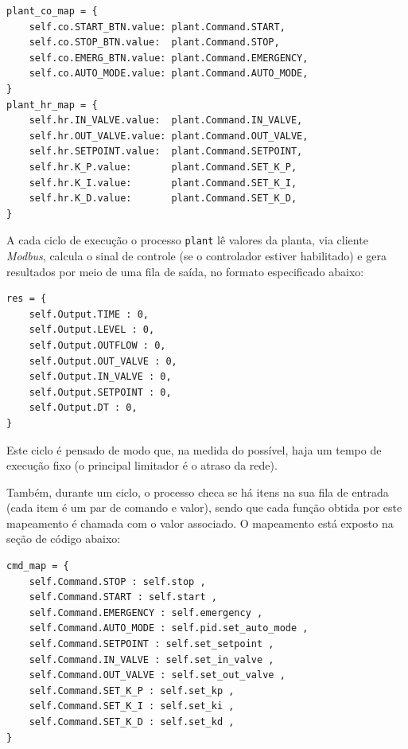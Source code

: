\documentclass[
	article,			%
	11pt,				%
	oneside,			%
	a4paper,			%
	section=TITLE,		%
	english,			%
	brazil,				%
	sumario=tradicional
	]{abntex2}
\newcommand{\Mb}{\textit{Modbus}}%
\begin{document}
\begin{verbatim}
plant_co_map = {
    self.co.START_BTN.value: plant.Command.START,
    self.co.STOP_BTN.value:  plant.Command.STOP,
    self.co.EMERG_BTN.value: plant.Command.EMERGENCY,
    self.co.AUTO_MODE.value: plant.Command.AUTO_MODE,
}
plant_hr_map = {
    self.hr.IN_VALVE.value:  plant.Command.IN_VALVE,
    self.hr.OUT_VALVE.value: plant.Command.OUT_VALVE,
    self.hr.SETPOINT.value:  plant.Command.SETPOINT,
    self.hr.K_P.value:       plant.Command.SET_K_P,
    self.hr.K_I.value:       plant.Command.SET_K_I,
    self.hr.K_D.value:       plant.Command.SET_K_D,
}
\end{verbatim}
A cada ciclo de execução o processo \texttt{plant} lê valores da planta, via cliente \Mb, calcula o sinal de controle (se o controlador estiver habilitado) e gera resultados por meio de uma fila de saída, no formato especificado abaixo:

\begin{verbatim}
res = {
    self.Output.TIME : 0,
    self.Output.LEVEL : 0,
    self.Output.OUTFLOW : 0,
    self.Output.OUT_VALVE : 0,
    self.Output.IN_VALVE : 0,
    self.Output.SETPOINT : 0,
    self.Output.DT : 0,
}
\end{verbatim}
Este ciclo é pensado de modo que, na medida do possível, haja um tempo de execução fixo (o principal limitador é o atraso da rede).



Também, durante um ciclo, o processo checa se há itens na sua fila de entrada (cada item é um par de comando e valor), sendo que cada função obtida por este mapeamento é chamada com o valor associado. O mapeamento está exposto na seção de código abaixo:

\begin{verbatim}
cmd_map = {
	self.Command.STOP : self.stop ,
	self.Command.START : self.start ,
	self.Command.EMERGENCY : self.emergency ,
	self.Command.AUTO_MODE : self.pid.set_auto_mode ,
	self.Command.SETPOINT : self.set_setpoint ,
	self.Command.IN_VALVE : self.set_in_valve ,
	self.Command.OUT_VALVE : self.set_out_valve ,
	self.Command.SET_K_P : self.set_kp ,
	self.Command.SET_K_I : self.set_ki ,
	self.Command.SET_K_D : self.set_kd ,
}
\end{verbatim}
\end{document}
